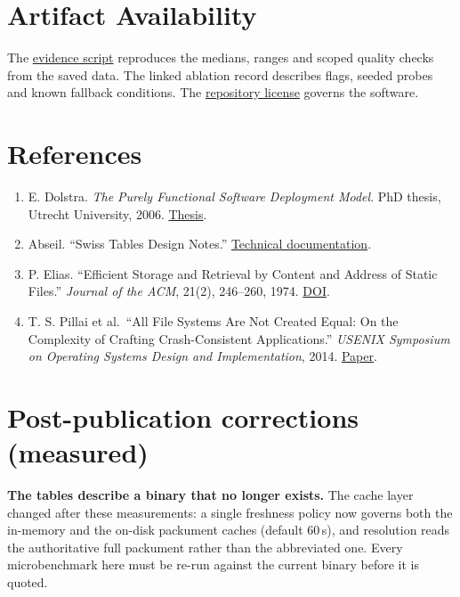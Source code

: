 \documentclass[
  11pt,
  letterpaper,
]{article}
\providecommand{\tightlist}{%
  \setlength{\itemsep}{0pt}\setlength{\parskip}{0pt}}
\begin{document}
\section*{Artifact Availability}\label{artifact-availability}

The \href{../../scripts/bench/paper_evidence.py}{evidence script}
reproduces the medians, ranges and scoped quality checks from the saved
data. The linked ablation record describes flags, seeded probes and
known fallback conditions. The \href{../../LICENSE}{repository license}
governs the software.

\section*{References}\label{references}

\begin{enumerate}
\def\labelenumi{\arabic{enumi}.}
\tightlist
\item
  E. Dolstra. \emph{The Purely Functional Software Deployment Model}.
  PhD thesis, Utrecht University, 2006.
  \href{https://nixos.org/~eelco/pubs/phd-thesis.pdf}{Thesis}.
\item
  Abseil. ``Swiss Tables Design Notes.''
  \href{https://abseil.io/about/design/swisstables}{Technical
  documentation}.
\item
  P. Elias. ``Efficient Storage and Retrieval by Content and Address of
  Static Files.'' \emph{Journal of the ACM}, 21(2), 246--260, 1974.
  \href{https://doi.org/10.1145/321812.321820}{DOI}.
\item
  T. S. Pillai et al.~``All File Systems Are Not Created Equal: On the
  Complexity of Crafting Crash-Consistent Applications.'' \emph{USENIX
  Symposium on Operating Systems Design and Implementation}, 2014.
  \href{https://www.usenix.org/conference/osdi14/technical-sessions/presentation/pillai}{Paper}.
\end{enumerate}


\section*{Post-publication corrections (measured)}

\textbf{The tables describe a binary that no longer exists.} The cache layer changed after these
measurements: a single freshness policy now governs both the in-memory and the on-disk packument
caches (default 60\,s), and resolution reads the authoritative full packument rather than the
abbreviated one. Every microbenchmark here must be re-run against the current binary before it is
quoted.
\end{document}
